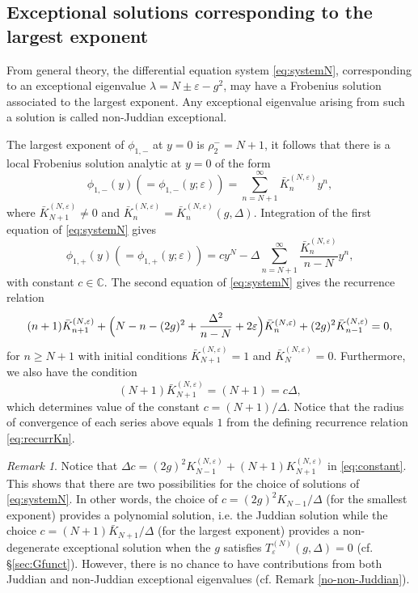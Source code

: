 \documentclass[11pt]{article}
\numberwithin{equation}{section}
\newcommand{\C}{\mathbb{C}} %
\newcommand{\e}{\varepsilon}
\theoremstyle{plain}
\theoremstyle{definition}
\theoremstyle{remark}
\newtheorem{rem}{Remark}[section]
\begin{document}
\subsection{Exceptional solutions corresponding to the largest exponent}\label{sec:LargestExponent}

From general theory, the differential equation system \eqref{eq:systemN}, corresponding to an exceptional eigenvalue \(\lambda = N \pm \e - g^2 \), may have a Frobenius solution associated to the largest exponent. Any exceptional eigenvalue arising from such a solution is called non-Juddian exceptional.

The largest exponent of \(\phi_{1,-}\) at \(y=0\) is \(\rho_2^-=N+1\), it follows that there is a local Frobenius solution analytic at \(y=0\) of the form
\begin{equation}\label{eq:largexpsol-}
  \phi_{1,-}(y) (= \phi_{1,-}(y;\e)) =\sum_{n=N+1}^\infty \bar{K}^{(N,\e)}_n y^n,
\end{equation}
where \(\bar{K}^{(N,\e)}_{N+1} \ne 0\) and \(\bar{K}^{(N,\e)}_n = \bar{K}^{(N,\e)}_n(g,\Delta)\). Integration of the first equation of
\eqref{eq:systemN} gives
\begin{equation}\label{eq:largexpsol+}
  \phi_{1,+}(y) (= \phi_{1,+}(y;\e)) = c y^N - \Delta \sum_{n=N+1}^\infty \frac{\bar{K}^{(N,\e)}_n}{n-N} y^n,
\end{equation}
with constant \(c \in \C\). The second equation of \eqref{eq:systemN} gives the recurrence relation
\begin{equation}\label{eq:recurrKn}
(n+1) \bar{K}^{(N,\e)}_{n+1} + \Bigl(N-n - (2 g)^2 + \frac{\Delta^2}{n-N} + 2\e \Bigr) \bar{K}^{(N,\e)}_n
+ (2g)^2 \bar{K}^{(N,\e)}_{n-1} = 0,
\end{equation}
for \(n \geq N+1\) with initial conditions \(\bar{K}^{(N,\e)}_{N+1}=1 \) and \( \bar{K}^{(N,\e)}_{N}=0\). Furthermore, we also have
the condition
\[
  (N+1) \bar{K}^{(N,\e)}_{N+1} = (N+1) =  c \Delta,
\]
which determines value of the constant \(c = (N+1)/\Delta\). Notice that the radius of convergence of each series above equals $1$ from the defining recurrence relation \eqref{eq:recurrKn}.

\begin{rem}
  Notice that $\Delta c = (2g)^2 K^{(N,\e)}_{N-1} + (N+1) K^{(N,\e)}_{N+1}$ in \eqref{eq:constant}. This shows that there are two possibilities
  for the choice of solutions of \eqref{eq:systemN}. In other words, the choice of $c = (2g)^2 K_{N-1} / \Delta$ (for the smallest exponent)
  provides a polynomial solution, i.e. the Juddian solution while the choice $c = (N+1)\bar{K}_{N+1}/\Delta$ (for the largest exponent) provides
  a non-degenerate exceptional solution when the \(g\) satisfies \(T_\e^{(N)}(g,\Delta) = 0\) (cf. \S \ref{sec:Gfunct}). However, there is no chance
  to have contributions from both Juddian and non-Juddian exceptional eigenvalues (cf. Remark \ref{no-non-Juddian}).
\end{rem} 
\end{document}
